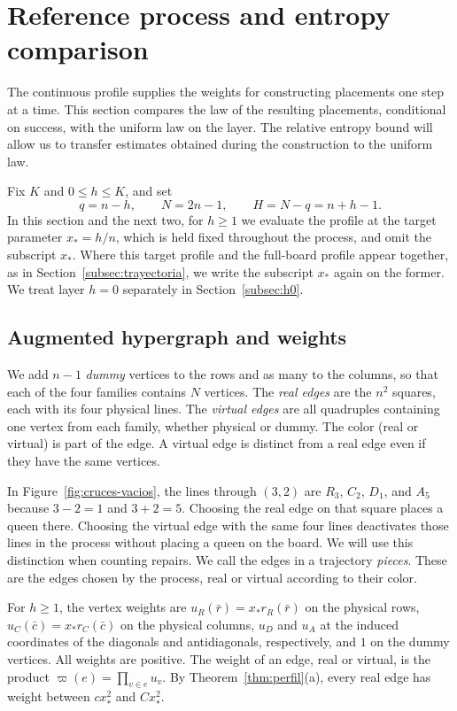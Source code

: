 \section{Reference process and entropy comparison}\label{sec:referencia}

The continuous profile supplies the weights for constructing placements one step at a time. This section
compares the law of the
resulting placements, conditional on success, with the uniform law on the layer. The relative entropy bound
will allow us to transfer
estimates obtained during the construction to the uniform law.

Fix $K$ and $0\le h\le K$, and set \[
 q=n-h,\qquad N=2n-1,\qquad H=N-q=n+h-1 .
\] In this section and the next two, for $h\ge1$ we evaluate the profile at the target parameter $x_*=h/n$,
which is held fixed
throughout the process, and omit the subscript $x_*$. Where this target profile and the full-board profile
appear together, as in
Section~\ref{subsec:trayectoria}, we write the subscript $x_*$ again on the former. We treat layer $h=0$
separately in
Section~\ref{subsec:h0}.

\subsection{Augmented hypergraph and weights}

We add $n-1$ \emph{dummy} vertices to the rows and as many to the columns, so that each of the four families
contains $N$ vertices. The
\emph{real edges} are the $n^2$ squares, each with its four physical lines. The \emph{virtual edges} are all
quadruples containing one
vertex from each family, whether physical or dummy. The color (real or virtual) is part of the edge. A
virtual edge is distinct from a
real edge even if they have the same vertices.

In Figure~\ref{fig:cruces-vacios}, the lines through $(3,2)$ are $R_3$, $C_2$, $D_1$, and $A_5$ because
$3-2=1$ and $3+2=5$. Choosing
the real edge on that square places a queen there. Choosing the virtual edge with the same four lines
deactivates those lines in the
process without placing a queen on the board. We will use this distinction when counting repairs. We call
the edges in a trajectory
\emph{pieces}. These are the edges chosen by the process, real or virtual according to their color.

For $h\ge1$, the vertex weights are $u_R(\bar r)=x_*r_R(\bar r)$ on the physical rows,
$u_C(\bar c)=x_*r_C(\bar c)$ on the physical
columns, $u_D$ and $u_A$ at the induced coordinates of the diagonals and antidiagonals, respectively, and
$1$ on the dummy vertices.
All weights are positive. The weight of an edge, real or virtual, is the product
$\varpi(e)=\prod_{v\in e}u_v$. By
Theorem~\ref{thm:perfil}(a), every real edge has weight between $cx_*^2$ and $Cx_*^2$.

